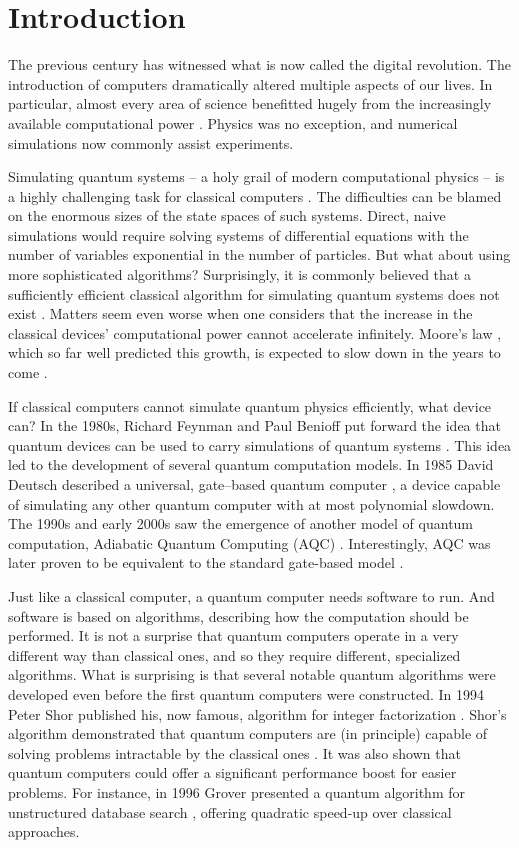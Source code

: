 \chapter{Introduction}
The previous century has witnessed what is now called the digital revolution.
The introduction of computers dramatically altered multiple aspects of our
lives. In particular, almost every area of science benefitted hugely from the
increasingly available computational power \cite{winsberg}. Physics was no
exception, and numerical simulations now commonly assist experiments.

Simulating quantum systems -- a holy grail of modern computational physics --
is a highly challenging task for classical computers \cite{feynman.82}. The
difficulties can be blamed on the enormous sizes of the state spaces of such
systems. Direct, naive simulations would require solving systems of
differential equations with the number of variables exponential in the number
of particles. But what about using more sophisticated algorithms? Surprisingly,
it is commonly believed that a sufficiently efficient classical algorithm for
simulating quantum systems does not exist \cite{feynman.82, poplavskii}.
Matters seem even worse when one considers that the increase in the classical
devices' computational power cannot accelerate infinitely. Moore's law
\cite{mack}, which so far well predicted this growth, is expected to slow down
in the years to come \cite{waldrop, kumar}.

If classical computers cannot simulate quantum physics efficiently, what device
can? In the 1980s, Richard Feynman and Paul Benioff put forward the idea that
quantum devices can be used to carry simulations of quantum systems
\cite{feynman.82,benioff.80}. This idea led to the development of several
quantum computation models. In 1985 David Deutsch described a universal,
gate--based quantum computer \cite{deutsch}, a device capable of simulating any
other quantum computer with at most polynomial slowdown. The 1990s and early
2000s saw the emergence of another model of quantum computation, Adiabatic
Quantum Computing (AQC) \cite{kadowaki,farhi}. Interestingly, AQC was later
proven to be equivalent to the standard gate-based model \cite{aharonov}.

Just like a classical computer, a quantum computer needs software to run. And
software is based on algorithms, describing how the computation should be
performed. It is not a surprise that quantum computers operate in a very
different way than classical ones, and so they require different, specialized
algorithms. What is surprising is that several notable quantum algorithms were
developed even before the first quantum computers were constructed. In 1994
Peter Shor published his, now famous, algorithm for integer factorization
\cite{shor}. Shor's algorithm demonstrated that quantum computers are (in
principle) capable of solving problems intractable by the classical ones
\cite{kleinjung}. It was also shown that quantum computers could offer a
significant performance boost for easier problems. For instance, in 1996 Grover
presented a quantum algorithm for unstructured database search \cite{grover},
offering quadratic speed-up over classical approaches.

